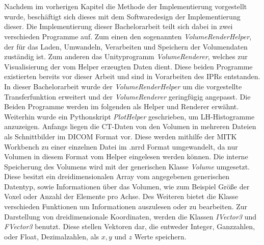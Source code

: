 \chapter{}
\label{sec:concept}


Nachdem im vorherigen Kapitel die Methode der Implementierung vorgestellt wurde, beschäftigt sich dieses mit dem Softwaredesign der Implementierung dieser.
\newline
Die Implementierung dieser Bachelorarbeit teilt sich dabei in zwei verschieden Programme auf. Zum einen den sogenannten \textit{VolumeRenderHelper}, der für das Laden, Umwandeln, Verarbeiten und Speichern der Volumendaten zuständig ist. Zum anderen das Unityprogramm \textit{VolumeRenderer}, welches zur Visualisierung der vom Helper erzeugten Daten dient. Diese beiden Programme existierten bereits vor dieser Arbeit und sind in Vorarbeiten des IPRs entstanden. In dieser Bachelorarbeit wurde der \textit{VolumeRenderHelper} um die vorgestellte Transferfunktion erweitert und der \textit{VolumeRenderer} geringfügig angepasst. Die Beiden Programme werden im folgenden als Helper und Renderer erwähnt. Weiterhin wurde ein Pythonskript \textit{PlotHelper} geschrieben, um LH-Histogramme anzuzeigen.
\newline
{}
Anfangs liegen die CT-Daten von den Volumen in mehreren Dateien als Schnittbilder im DICOM Format vor. Diese werden mithilfe der MITK Workbench zu einer einzelnen Datei im .nrrd Format umgewandelt, da nur Volumen in diesem Format vom Helper eingelesen werden können.
\newline
Die interne Speicherung des Volumens wird mit der generischen Klasse \textit{Volume} umgesetzt. Diese besitzt ein dreidimensionalen Array vom angegebenen generischen Datentyp, sowie Informationen über das Volumen, wie zum Beispiel Größe der Voxel oder Anzahl der Elemente pro Achse. Des Weiteren bietet die Klasse verschieden Funktionen um Informationen auszulesen oder zu bearbeiten. Zur Darstellung von dreidimensionale Koordinaten, werden die Klassen \textit{IVector3} und \textit{FVector3} benutzt. Diese stellen Vektoren dar, die entweder Integer, Ganzzahlen, oder Float, Dezimalzahlen, als $x,y$ und $z$ Werte speichern.
\newline
{}
